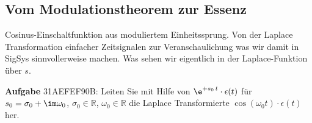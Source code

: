 



\clearpage
\subsection{Vom Modulationstheorem zur Essenz}
\label{sec:31AEFEF90B}
\begin{Ziel}
Cosinus-Einschaltfunktion aus moduliertem Einheitssprung. Von der
Laplace Transformation einfacher Zeitsignalen zur Veranschaulichung was wir damit
in SigSys sinnvollerweise machen. Was sehen wir eigentlich in der Laplace-Funktion
über $s$.
\end{Ziel}
\textbf{Aufgabe} {\tiny 31AEFEF90B}: Leiten Sie mit Hilfe von
$\e^{+s_0 \, t} \cdot \epsilon(t)$ für
$s_0=\sigma_0 + \im \omega_0$,
$\sigma_0\in\mathbb{R}$,
$\omega_0\in\mathbb{R}$
die Laplace Transformierte
$\cos(\omega_0 t) \cdot \epsilon(t)$ her.


